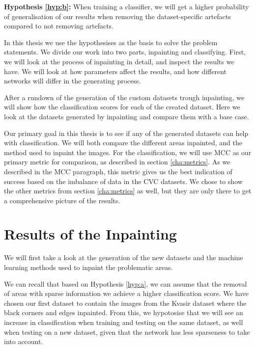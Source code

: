 \vspace{5px}


\noindent 
\textbf{Hypothesis \ref{hyp:b}:}
When training a classifier, we will get a higher probability of generalisation of our results when removing the dataset-specific artefacts compared to not removing artefacts.
\vspace{5px}

In this thesis we use the hypothesises as the basis to solve the problem statements. 
We divide our work into two parts, inpainting and classifying. 
First, we will look at the process of inpainting in detail, and inspect the results we have.  
We will look at how parameters affect the results, and how different networks will differ in the generating process. 


After a rundown of the generation of the custom datasets trough inpainting, we will show how the classification scores for each of the created dataset. Here we look at the datasets generated by inpainting and compare them with a base case. 

Our primary goal in this thesis is to see if any of the generated datasets can help with classification. We will both compare the different areas inpainted, and the method used to inpaint the images. 
For the classification, we will use MCC as our primary metric for comparison, as described in section \ref{cha:metrics}. As we described in the MCC paragraph, this metric gives us the best indication of success based on the imbalance of data in the CVC datasets. We chose to show the other metrics from section \ref{cha:metrics} as well, but they are only there to get a comprehensive picture of the results.




\section{Results of the Inpainting}
We will first take a look at the generation of the new datasets and the machine learning methods used to inpaint the problematic areas.

We can recall that based on  Hypothesis \ref{hyp:a}, we can assume that the removal of areas with sparse information we achieve a higher classification score. We have chosen our first dataset to contain the images from the Kvasir dataset where the black corners and edges inpainted. 
From this, we hypotosise that we will see an increase in classification when training and testing on the same dataset, as well when testing on a new dataset, given that the network has less sparseness to take into account. 

